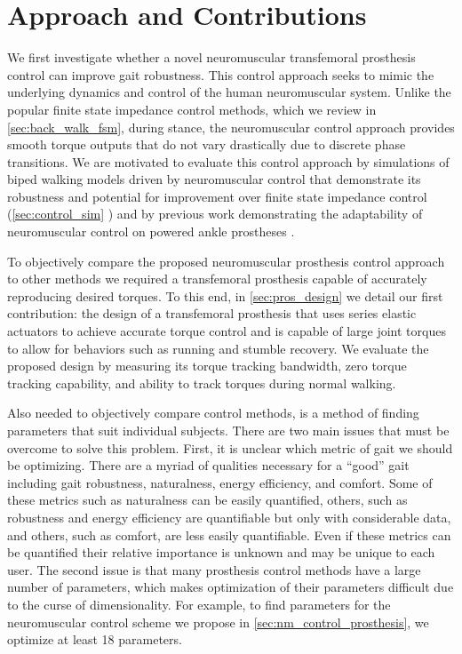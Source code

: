 \section{Approach and Contributions}\label{sec:intro_approach_contrib} 

We first investigate whether a novel neuromuscular transfemoral prosthesis
control can improve gait robustness. This control approach seeks to mimic the
underlying dynamics and control of the human neuromuscular system. Unlike the
popular finite state impedance control methods, which we review in
\cref{sec:back_walk_fsm}, during stance, the neuromuscular control approach
provides smooth torque outputs that do not vary drastically due to discrete
phase transitions.  We are motivated to evaluate this control approach by
simulations of biped walking models driven by neuromuscular control that
demonstrate its robustness \citep{song2013integration,song2015neural} and
potential for improvement over finite state impedance control
(\cref{sec:control_sim} \citep{thatte2016toward}) and by previous work
demonstrating the adaptability of neuromuscular control on powered ankle
prostheses \citep{eilenberg2010control,markowitz2011speed}.

To objectively compare the proposed neuromuscular prosthesis control approach to
other methods we required a transfemoral prosthesis capable of accurately
reproducing desired torques. To this end, in \cref{sec:pros_design} we detail
our first contribution: the design of a transfemoral prosthesis that uses series
elastic actuators to achieve accurate torque control and is capable of large
joint torques to allow for behaviors such as running and stumble recovery.  We
evaluate the proposed design by measuring its torque tracking bandwidth, zero
torque tracking capability, and ability to track torques during normal walking.

Also needed to objectively compare control methods, is a method of finding
parameters that suit individual subjects. There are two main issues that must be
overcome to solve this problem. First, it is unclear which metric of gait we
should be optimizing. There are a myriad of qualities necessary for a ``good''
gait including gait robustness, naturalness, energy efficiency, and comfort.
Some of these metrics such as naturalness can be easily quantified, others, such
as robustness and energy efficiency are quantifiable but only with considerable
data, and others, such as comfort, are less easily quantifiable. Even if these
metrics can be quantified their relative importance is unknown and may be unique
to each user. The second issue is that many prosthesis control methods have a
large number of parameters, which makes optimization of their parameters
difficult due to the curse of dimensionality. For example, to find parameters
for the neuromuscular control scheme we propose in 
\cref{sec:nm_control_prosthesis}, we optimize at least 18 parameters.


